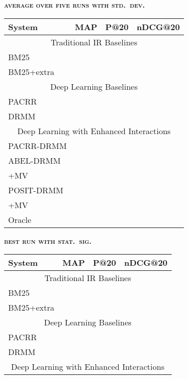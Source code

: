 \documentclass[11pt,a4paper]{article}
\begin{document}
\begin{table*}[t]
\footnotesize
\begin{minipage}{3.15in}
\begin{center}
\textbf{\textsc{{\normalsize average over five runs with std.\ dev.}}}\\
\vspace{0.2em}
\begin{tabular}{|llll|}
\hline
{\bf System}& {\bf MAP}    & {\bf P@20}   & {\bf nDCG@20} \\ \hline
\multicolumn{4}{|c|}{Traditional IR Baselines} \\ \hline
BM25        &  &  &  \\
BM25+extra  &  &  &  \\ \hline
\multicolumn{4}{|c|}{Deep Learning Baselines} \\ \hline
PACRR       &  &  &  \\
DRMM        &  &  & \\ \hline
\multicolumn{4}{|c|}{Deep Learning with Enhanced Interactions} \\ \hline
PACRR-DRMM  &  &  &  \\
ABEL-DRMM   &  &  &  \\
+MV  &  &  &  \\
POSIT-DRMM  &  &  & \\
+MV  &  &  & \\ \hline\hline
Oracle      &  &  &  \\ \hline
\end{tabular}
\end{center}
\end{minipage}
\begin{minipage}{3.1in}
\begin{center}
\textbf{\textsc{{\normalsize best run with stat.\ sig.}}}\\
\vspace{0.2em}
\begin{tabular}{|llll|}
\hline
{\bf System}& {\bf MAP}    & {\bf P@20}   & {\bf nDCG@20} \\ \hline
\multicolumn{4}{|c|}{Traditional IR Baselines} \\ \hline
BM25        &  &  &  \\
BM25+extra  &  &  &  \\ \hline
\multicolumn{4}{|c|}{Deep Learning Baselines} \\ \hline
PACRR       &  &  &  \\
DRMM        &  &  & \\ \hline
\multicolumn{4}{|c|}{Deep Learning with Enhanced Interactions} \\ \hline

\end{tabular}
\end{center}
\end{minipage}
\end{table*}
\end{document}
